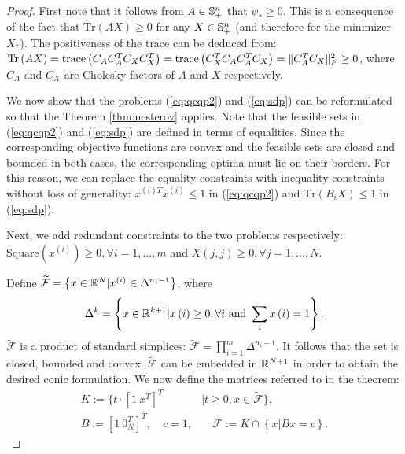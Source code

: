\begin{proof}
First note that it follows from $A \in \mathbb{S}_{+}^n$ that $\psi_* \geq
0$. This is a consequence of the fact that $\mathrm{Tr}\left(A X \right) \geq 0$ for any $X \in \mathbb{S}_+^n$ (and therefore for the minimizer $X_*$). The positiveness of the trace can be deduced from: $\mathrm{Tr}\left(A X \right) = \mathrm{trace}\left(C_A C_A^T C_X C_X^T \right) = \mathrm{trace}\left(C_X^T C_A C_A^T C_X \right) = \lVert C_A^T C_X\rVert_F^2 \geq 0 $, where $C_A$ and $C_X$ are Cholesky factors of $A$ and $X$ respectively.

We now show that the problems (\ref{eq:qcqp2}) and (\ref{eq:sdp}) can be reformulated so that the Theorem \ref{thm:nesterov} applies.
%
Note that the feasible sets in (\ref{eq:qcqp2}) and
(\ref{eq:sdp}) are defined in terms of equalities. Since the corresponding objective
functions are convex and the feasible sets are closed and bounded in
both cases, the corresponding optima must lie on their borders. For this reason, we can replace the equality constraints with inequality constraints without loss of generality:
$x^{(i)T}x^{(i)} \leq 1$ in (\ref{eq:qcqp2}) and $\mathrm{Tr}
\left(B_i X\right) \leq 1$ in (\ref{eq:sdp}).

Next, we add redundant constraints to the two problems respectively: $\mathrm{Square}\left(x^{(i)}\right) \geq 0, \forall i = 1,\ldots,m$  and $X\left(j,j\right) \geq 0, \forall j = 1,\ldots, N$.  %


Define $\widetilde{\mathcal{F}} = \left\{x \in \mathbb{R}^N | x^{(i)} \in \Delta^{n_i -1} \right\}$, where $$\Delta^{k} = \left\{ x \in \mathbb{R}^{k+1} | x\left(i\right) \geq 0, \forall i ~\mathrm{and}~ \sum_i x\left(i\right) = 1 \right\}.$$
%
$\widetilde{\mathcal{F}}$ is a product of standard simplices: $\widetilde{\mathcal{F}} = \prod_{i = 1}^m \Delta^{n_i -1}$. It follows that the set is closed, bounded and convex.
%
 $\widetilde{\mathcal{F}}$ can be embedded in $\mathbb{R}^{N+1}$ in order to obtain the desired conic formulation. We now define the matrices referred to in the theorem:
\begin{align*}
K := \{ t\cdot \left[1~ x^T\right]^T &| t \geq 0, x \in \widetilde{\mathcal{F}} \}, \\
B := \left[1~ 0_N^T\right]^T,\quad c = 1,& \quad \mathcal{F} := K \cap \left\{x | B x = c \right\}.
\end{align*}


\end{proof}
